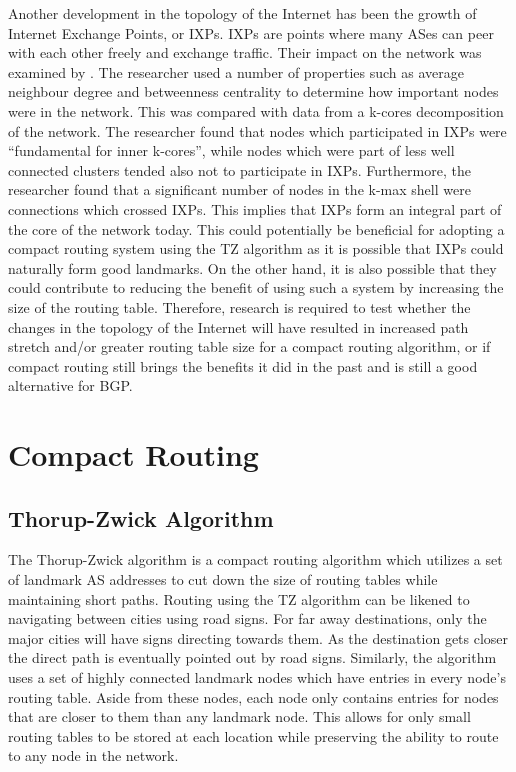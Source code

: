 \documentclass{mpaper}
\begin{document}
Another development in the topology of the Internet has been the growth of Internet Exchange Points, or IXPs. IXPs are points where many ASes can peer with each other freely and exchange traffic. Their impact on the network was examined by \cite{gregori}. The researcher used a number of properties such as average neighbour degree and betweenness centrality to determine how important nodes were in the network. This was compared with data from a k-cores decomposition of the network. The researcher found that nodes which participated in IXPs were ``fundamental for inner k-cores'', while nodes which were part of less well connected clusters tended also not to participate in IXPs. Furthermore, the researcher found that a significant number of nodes in the k-max shell were connections which crossed IXPs. This implies that IXPs form an integral part of the core of the network today. This could potentially be beneficial for adopting a compact routing system using the TZ algorithm as it is possible that IXPs could naturally form good landmarks. On the other hand, it is also possible that they could contribute to reducing the benefit of using such a system by increasing the size of the routing table. Therefore, research is required to test whether the changes in the topology of the Internet will have resulted in increased path stretch and/or greater routing table size for a compact routing algorithm, or if compact routing still brings the benefits it did in the past and is still a good alternative for BGP. 

\section{Compact Routing}
\subsection{Thorup-Zwick Algorithm}

The Thorup-Zwick algorithm \cite{thorup} is a compact routing algorithm which utilizes a set of landmark AS addresses to cut down the size of routing tables while maintaining short paths. Routing using the TZ algorithm can be likened to navigating between cities using road signs. For far away destinations, only the major cities will have signs directing towards them. As the destination gets closer the direct path is eventually pointed out by road signs. Similarly, the algorithm uses a set of highly connected landmark nodes which have entries in every node's routing table. Aside from these nodes, each node only contains entries for nodes that are closer to them than any landmark node. This allows for only small routing tables to be stored at each location while preserving the ability to route to any node in the network.
\end{document}
